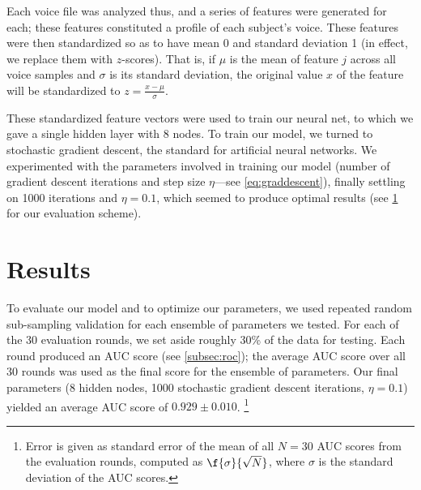 \documentclass[10pt]{article}
\begin{document}
Each voice file was analyzed thus, and a series of features were generated for each; these features constituted a profile of each subject's voice.
These features were then standardized so as to have mean 0 and standard deviation 1 (in effect, we replace them with $z$-scores).
That is, if $\mu$ is the mean of feature $j$ across all voice samples and $\sigma$ is its standard deviation, the original value $x$ of the feature will be standardized to $z = \frac{x - \mu}{\sigma}$.

These standardized feature vectors were used to train our neural net, to which we gave a single hidden layer with 8 nodes.
To train our model, we turned to stochastic gradient descent, the standard for artificial neural networks.
We experimented with the parameters involved in training our model (number of gradient descent iterations and step size $\eta$---see \cref{eq:graddescent}), finally settling on 1000 iterations and $\eta = 0.1$, which seemed to produce optimal results (see \cref{sec:results} for our evaluation scheme).

\section{Results}
\label{sec:results}

To evaluate our model and to optimize our parameters, we used repeated random sub-sampling validation for each ensemble of parameters we tested. For each of the 30 evaluation rounds, we set aside roughly 30\% of the data for testing. Each round produced an AUC score (see \cref{subsec:roc}); the average AUC score over all 30 rounds was used as the final score for the ensemble of parameters. Our final parameters (8 hidden nodes, 1000 stochastic gradient descent iterations, $\eta = 0.1$) yielded an average AUC score of $0.929 \pm 0.010$. \footnote{Error is given as standard error of the mean of all $N = 30$ AUC scores from the evaluation rounds, computed as $\f{\sigma}{\sqrt{N}}$, where $\sigma$ is the standard deviation of the AUC scores.}
\end{document}
